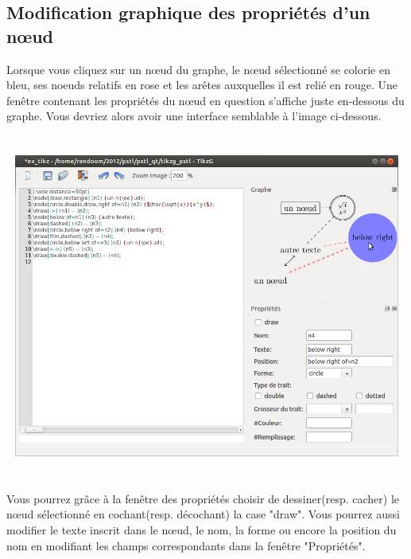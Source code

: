 \documentclass[a4paper]{report}
\begin{document}
\subsection{Modification graphique des propriétés d'un n{\oe}ud}
Lorsque vous cliquez sur un n{\oe}ud du graphe, le n{\oe}ud sélectionné se colorie en bleu, ses noeuds relatifs en rose et les arêtes auxquelles il est relié en rouge. Une fenêtre contenant les propriétés du n{\oe}ud en question s'affiche juste en-dessous du graphe. 
Vous devriez alors avoir une interface semblable à l'image ci-dessous.\\ \\ \\
\includegraphics[width=15cm, height=10cm]{img/r_12.png} \\ \\ \\
Vous pourrez grâce à la fenêtre des propriétés choisir de dessiner(resp. cacher) le n{\oe}ud sélectionné en cochant(resp. décochant) la case "draw". Vous pourrez aussi modifier le texte inscrit dans le n{\oe}ud, le nom, la forme ou encore la position du nom en modifiant les champs correspondants dans la fenêtre "Propriétés".
\end{document}
